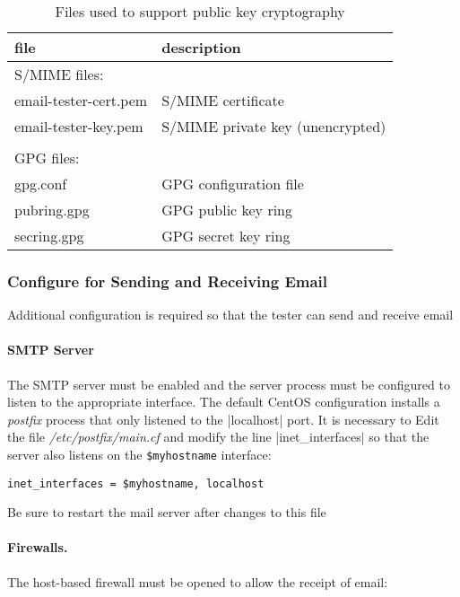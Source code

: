 \documentclass[preprint,3p,11pt]{elsarticle}
\begin{document}
\begin{table}
\begin{tabular}{|ll|}
\hline
file & description\\
\hline
\multicolumn{2}{|l|}{S/MIME files:}\\
email-tester-cert.pem & S/MIME certificate \\
email-tester-key.pem & S/MIME private key (unencrypted)\\
&\\
\multicolumn{2}{|l|}{GPG files:}\\
gpg.conf & GPG configuration file\\
pubring.gpg & GPG public key ring\\
secring.gpg & GPG secret key ring\\
\hline
\end{tabular}
\caption{Files used to support public key cryptography}\label{crypto-files}
\end{table}



\subsubsection{Configure for Sending and Receiving Email}

Additional configuration is required so that the tester can send and receive email

\paragraph{SMTP Server}

The SMTP server must be enabled and the server process must be
configured to listen to the appropriate interface. The default CentOS
configuration installs a \emph{postfix} process that only listened to
the |localhost| port. It is necessary to Edit the file
  \emph{/etc/postfix/main.cf} and modify the line |inet_interfaces| so
  that the server also listens on the \texttt{\$myhostname} interface:

\begin{Verbatim}[commandchars=\\\{\},fontsize=\small]
inet_interfaces = $myhostname, localhost
\end{Verbatim}

Be sure to restart the mail server after changes to this file

\paragraph{Firewalls.} The host-based firewall must be opened to allow the receipt of email:
\end{document}
